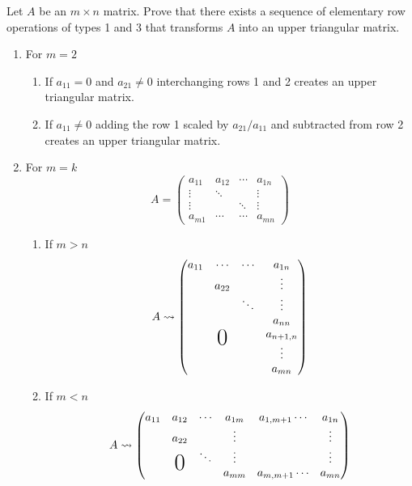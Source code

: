 Let $A$ be an $m\times n$ matrix. Prove that there exists a sequence
of elementary row operations of types 1 and 3 that transforms $A$ into
an upper triangular matrix.
\begin{enumerate}
\item For $m = 2$
\begin{enumerate}
\item If $a_{11} = 0$ and $a_{21}\neq 0$ interchanging rows 1 and 2
  creates an upper triangular matrix.
\item If $a_{11} \neq 0$ adding the row 1 scaled by $a_{21}/a_{11}$
  and subtracted from row 2 creates an upper triangular matrix.
\end{enumerate}
\item For $m = k$ 
\begin{equation}
A = \begin{pmatrix}
a_{11} & a_{12} & \cdots & a_{1n}\\
\vdots & \ddots & & \vdots\\
\vdots & & \ddots & \vdots\\
a_{m1} & \cdots & \cdots & a_{mn}
\end{pmatrix}
\end{equation}
\begin{enumerate}
\item If $m> n$
\begin{equation}
A \leadsto \begin{pmatrix}
a_{11} & \cdots & \cdots & a_{1n}\\
& a_{22} & & \vdots\\
& & \ddots & \vdots\\
& & & a_{nn}\\
&\bigzero & & a_{n+1,n}\\
& & & \vdots\\
& & & a_{mn}
\end{pmatrix}
\end{equation}
\item If $m<n$ 
\begin{equation}
A \leadsto
\begin{pmatrix}
a_{11}& a_{12} & \cdots & a_{1m} & a_{1,m+1} \cdots & a_{1n}\\
& a_{22} & & \vdots & &  \vdots\\
& \bigzero & \ddots & \vdots & &  \vdots\\
& & & a_{mm} & a_{m,m+1} \cdots & a_{mn}\\
\end{pmatrix}
\end{equation}

\end{enumerate}
\end{enumerate}
